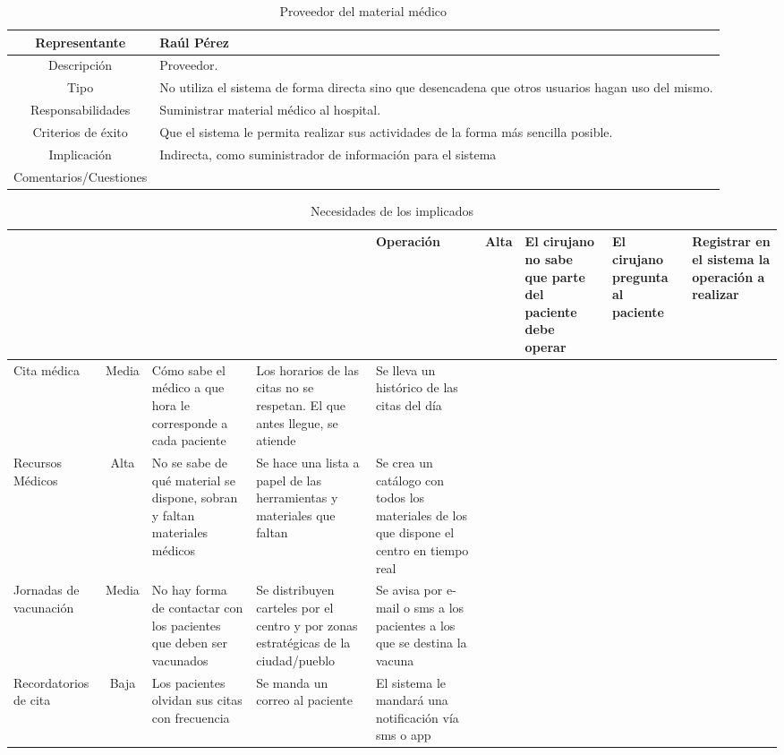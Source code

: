 \documentclass[12pt, spanish]{article}
\begin{document}
\begin{longtable}{|c|p{.65\linewidth}|}
   \caption{Proveedor del material médico} \\
   \hline
   Representante & Raúl Pérez\\
   \hline
   Descripción & Proveedor. \\
   \hline
   Tipo & No utiliza el sistema de forma directa sino que desencadena que otros usuarios hagan uso del mismo.  \\
   \hline
   Responsabilidades & Suministrar material médico al hospital. \\
   \hline
   Criterios de éxito & Que el sistema le permita realizar sus actividades de la forma más sencilla posible. \\
   \hline
   Implicación & Indirecta, como suministrador de información para el sistema \\
   \hline
   Comentarios/Cuestiones & \\
   \hline
\end{longtable}


\begin{longtable}{|p{.15\linewidth}|c|p{.2\linewidth}|p{.2\linewidth}|p{.25\linewidth}|}
  \caption{Necesidades de los implicados} \\
  \hline
    &  &  &   & 
  \endhead
  \hline
  \centering Operación & Alta & El cirujano no sabe que parte del paciente debe operar & El cirujano pregunta al paciente & Registrar en el sistema la operación a realizar\\
  \hline
  \centering Cita médica & Media & Cómo sabe el médico a que hora le corresponde a cada paciente & Los horarios de las citas no se respetan. El que antes llegue, se atiende & Se lleva un histórico de las citas del día \\
  \hline
  \centering Recursos Médicos & Alta & No se sabe de qué material se dispone, sobran y faltan materiales médicos & Se hace una lista a papel de las herramientas y materiales que faltan & Se crea un catálogo con todos los materiales de los que dispone el centro en tiempo real \\
  \hline
  \centering Jornadas de vacunación & Media & No hay forma de contactar con los pacientes que deben ser vacunados & Se distribuyen carteles por el centro y por zonas estratégicas de la ciudad/pueblo & Se avisa por e-mail o sms a los pacientes a los que se destina la vacuna \\
  \hline
  \centering Recordatorios de cita & Baja & Los pacientes olvidan sus citas con frecuencia & Se manda un correo al paciente & El sistema le mandará una notificación vía sms o app \\
  \hline
\end{longtable}
\end{document}
